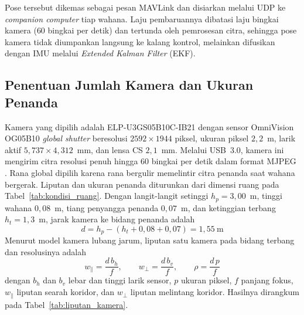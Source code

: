 \documentclass[12pt,a4paper]{report}
\begin{document}
Pose tersebut dikemas sebagai pesan MAVLink dan disiarkan melalui UDP ke \textit{companion computer} tiap wahana. Laju pembaruannya dibatasi laju bingkai kamera ($60$ bingkai per detik) dan tertunda oleh pemrosesan citra, sehingga pose kamera tidak diumpankan langsung ke kalang kontrol, melainkan difusikan dengan IMU melalui \textit{Extended Kalman Filter} (EKF\label{abbr:ekf}).

\subsection{Penentuan Jumlah Kamera dan Ukuran Penanda}
\label{subsec:liputan_kamera}

Kamera yang dipilih adalah ELP-U3GS05B10C-IB21 dengan sensor OmniVision OG05B10 \textit{global shutter} beresolusi $2592 \times 1944$ piksel, ukuran piksel $2{,}2$~\textmu m, larik aktif $5{,}737 \times 4{,}312$~mm, dan lensa CS $2{,}1$~mm. Melalui USB~3.0, kamera ini mengirim citra resolusi penuh hingga $60$ bingkai per detik dalam format MJPEG \cite{elpGlobalShutterOG05B10}. Rana global dipilih karena rana bergulir memelintir citra penanda saat wahana bergerak. Liputan dan ukuran penanda diturunkan dari dimensi ruang pada Tabel~\ref{tab:kondisi_ruang}. Dengan langit-langit setinggi $h_p = 3{,}00$~m, tinggi wahana $0{,}08$~m, tiang penyangga penanda $0{,}07$~m, dan ketinggian terbang $h_t = 1{,}3$~m, jarak kamera ke bidang penanda adalah
\begin{equation}
    d = h_p - (h_t + 0{,}08 + 0{,}07) = 1{,}55\ \text{m}
\end{equation}
Menurut model kamera lubang jarum, liputan satu kamera pada bidang terbang dan resolusinya adalah
\begin{equation}
    w_\parallel = \frac{d\,b_h}{f}, \qquad w_\perp = \frac{d\,b_v}{f}, \qquad \rho = \frac{d\,p}{f}
\end{equation}
dengan $b_h$ dan $b_v$ lebar dan tinggi larik sensor, $p$ ukuran piksel, $f$ panjang fokus, $w_\parallel$ liputan searah koridor, dan $w_\perp$ liputan melintang koridor. Hasilnya dirangkum pada Tabel~\ref{tab:liputan_kamera}.
\end{document}
